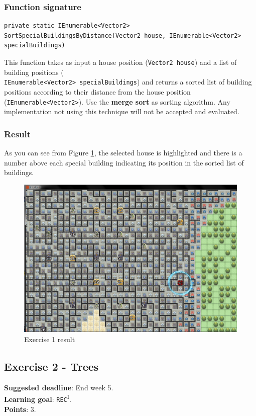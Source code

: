 \subsubsection*{Function signature} 
\begin{lstlisting}
private static IEnumerable<Vector2> SortSpecialBuildingsByDistance(Vector2 house, IEnumerable<Vector2> specialBuildings)
\end{lstlisting}

This function takes as input a house position (\texttt{Vector2 house}) and a list of building positions (\\ \texttt{IEnumerable<Vector2> specialBuildings}) and returns a sorted list of building positions according to their distance from the house position (\texttt{IEnumerable<Vector2>}). Use the \textbf{merge sort} as sorting algorithm. Any implementation not using this technique will not be accepted and evaluated.\\

\subsubsection*{Result}
As you can see from Figure \ref{img:Ex1}, the selected house is highlighted and there is a number above each special building indicating its position in the sorted list of buildings. 

\begin{figure}[!h]
\centering
\includegraphics[scale=0.25]{img/exercise1}
\caption{Exercise 1 result}
\label{img:Ex1}
\end{figure}

\newpage
\subsection*{Exercise 2 - Trees}
\textbf{Suggested deadline}: End week 5. \\
\textbf{Learning goal}: \texttt{REC}\textsuperscript{I}. \\
\textbf{Points}: 3.

